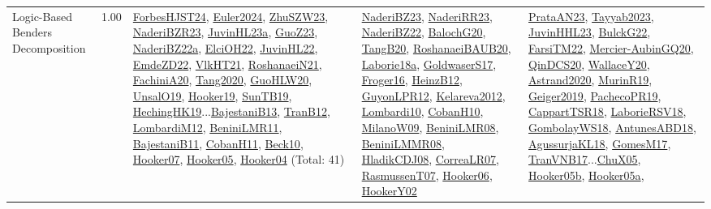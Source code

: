 {\begin{longtable}{p{3cm}r>{\raggedright\arraybackslash}p{6cm}>{\raggedright\arraybackslash}p{6cm}>{\raggedright\arraybackslash}p{8cm}}
\index{Logic-Based Benders Decomposition}\index{Concepts!Logic-Based Benders Decomposition}Logic-Based Benders Decomposition &  1.00 & \hyperref[detail:ForbesHJST24]{ForbesHJST24}, \hyperref[detail:Euler2024]{Euler2024}, \hyperref[detail:ZhuSZW23]{ZhuSZW23}, \hyperref[detail:NaderiBZR23]{NaderiBZR23}, \hyperref[detail:JuvinHL23a]{JuvinHL23a}, \hyperref[detail:GuoZ23]{GuoZ23}, \hyperref[detail:NaderiBZ22a]{NaderiBZ22a}, \hyperref[detail:ElciOH22]{ElciOH22}, \hyperref[detail:JuvinHL22]{JuvinHL22}, \hyperref[detail:EmdeZD22]{EmdeZD22}, \hyperref[detail:VlkHT21]{VlkHT21}, \hyperref[detail:RoshanaeiN21]{RoshanaeiN21}, \hyperref[detail:FachiniA20]{FachiniA20}, \hyperref[detail:Tang2020]{Tang2020}, \hyperref[detail:GuoHLW20]{GuoHLW20}, \hyperref[detail:UnsalO19]{UnsalO19}, \hyperref[detail:Hooker19]{Hooker19}, \hyperref[detail:SunTB19]{SunTB19}, \hyperref[detail:HechingHK19]{HechingHK19}...\hyperref[detail:BajestaniB13]{BajestaniB13}, \hyperref[detail:TranB12]{TranB12}, \hyperref[detail:LombardiM12]{LombardiM12}, \hyperref[detail:BeniniLMR11]{BeniniLMR11}, \hyperref[detail:BajestaniB11]{BajestaniB11}, \hyperref[detail:CobanH11]{CobanH11}, \hyperref[detail:Beck10]{Beck10}, \hyperref[detail:Hooker07]{Hooker07}, \hyperref[detail:Hooker05]{Hooker05}, \hyperref[detail:Hooker04]{Hooker04} (Total: 41) & \hyperref[detail:NaderiBZ23]{NaderiBZ23}, \hyperref[detail:NaderiRR23]{NaderiRR23}, \hyperref[detail:NaderiBZ22]{NaderiBZ22}, \hyperref[detail:BalochG20]{BalochG20}, \hyperref[detail:TangB20]{TangB20}, \hyperref[detail:RoshanaeiBAUB20]{RoshanaeiBAUB20}, \hyperref[detail:Laborie18a]{Laborie18a}, \hyperref[detail:GoldwaserS17]{GoldwaserS17}, \hyperref[detail:Froger16]{Froger16}, \hyperref[detail:HeinzB12]{HeinzB12}, \hyperref[detail:GuyonLPR12]{GuyonLPR12}, \hyperref[detail:Kelareva2012]{Kelareva2012}, \hyperref[detail:Lombardi10]{Lombardi10}, \hyperref[detail:CobanH10]{CobanH10}, \hyperref[detail:MilanoW09]{MilanoW09}, \hyperref[detail:BeniniLMR08]{BeniniLMR08}, \hyperref[detail:BeniniLMMR08]{BeniniLMMR08}, \hyperref[detail:HladikCDJ08]{HladikCDJ08}, \hyperref[detail:CorreaLR07]{CorreaLR07}, \hyperref[detail:RasmussenT07]{RasmussenT07}, \hyperref[detail:Hooker06]{Hooker06}, \hyperref[detail:HookerY02]{HookerY02} & \hyperref[detail:PrataAN23]{PrataAN23}, \hyperref[detail:Tayyab2023]{Tayyab2023}, \hyperref[detail:JuvinHHL23]{JuvinHHL23}, \hyperref[detail:BulckG22]{BulckG22}, \hyperref[detail:FarsiTM22]{FarsiTM22}, \hyperref[detail:Mercier-AubinGQ20]{Mercier-AubinGQ20}, \hyperref[detail:QinDCS20]{QinDCS20}, \hyperref[detail:WallaceY20]{WallaceY20}, \hyperref[detail:Astrand2020]{Astrand2020}, \hyperref[detail:MurinR19]{MurinR19}, \hyperref[detail:Geiger2019]{Geiger2019}, \hyperref[detail:PachecoPR19]{PachecoPR19}, \hyperref[detail:CappartTSR18]{CappartTSR18}, \hyperref[detail:LaborieRSV18]{LaborieRSV18}, \hyperref[detail:GombolayWS18]{GombolayWS18}, \hyperref[detail:AntunesABD18]{AntunesABD18}, \hyperref[detail:AgussurjaKL18]{AgussurjaKL18}, \hyperref[detail:GomesM17]{GomesM17}, \hyperref[detail:TranVNB17]{TranVNB17}...\hyperref[detail:ChuX05]{ChuX05}, \hyperref[detail:Hooker05b]{Hooker05b}, \hyperref[detail:Hooker05a]{Hooker05a}, 
\end{longtable}}
